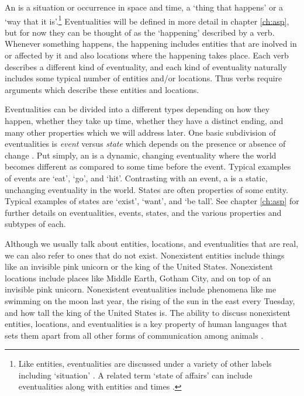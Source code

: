 An  is a situation or occurrence in space and time, a ‘thing that happens’ or a ‘way that it is’.\footnote{Like entities, eventualities are discussed under a variety of other labels including ‘situation’ \parencites{binnick:1991}{smith:1997}{kratzer:2019}. A related term ‘state of affairs’ can include eventualities along with entities and times \parencites{binnick:1991}{textor:2016}{kratzer:2019}.} Eventualities will be defined in more detail in chapter \ref{ch:asp}, but for now they can be thought of as the ‘happening’ described by a verb. Whenever something happens, the happening includes entities that are inolved in or affected by it and also locations where the happening takes place. Each verb describes a different kind of eventuality, and each kind of eventuality naturally includes some typical number of entities and/or locations. Thus verbs require arguments which describe these entities and locations.

Eventualities can be divided into a different types depending on how they happen, whether they take up time, whether they have a distinct ending, and many other properties which we will address later. One basic subdivision of eventualities is \emph{event} versus \emph{state} which depends on the presence or absence of change \parencites{bach:1986}{higginbotham:2000}{maienborn:2011}{zucchi:2015}. Put simply, an  is a dynamic, changing eventuality where the world becomes different as compared to some time before the event. Typical examples of events are ‘eat’, ‘go’, and ‘hit’. Contrasting with an event, a  is a static, unchanging eventuality in the world. States are often properties of some entity. Typical examples of states are ‘exist’, ‘want’, and ‘be tall’.  See chapter \ref{ch:asp} for further details on eventualities, events, states, and the various properties and subtypes of each.

Although we usually talk about entities, locations, and eventualities that are real, we can also refer to ones that do not exist. Nonexistent entities include things like an invisible pink unicorn or the king of the United States. Nonexistent locations include places like Middle Earth, Gotham City, and on top of an invisible pink unicorn. Nonexistent eventualities include phenomena like me swimming on the moon last year, the rising of the sun in the east every Tuesday, and how tall the king of the United States is. The ability to discuss nonexistent entities, locations, and eventualities is a key property of human languages that sets them apart from all other forms of communication among animals \parencite{hockett:1960}.


